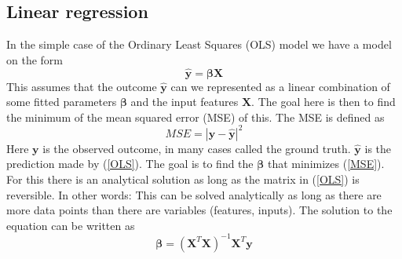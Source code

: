 \subsection{Linear regression}
In the simple case of the Ordinary Least Squares (OLS) model we have a model on the form 
\begin{equation}
\mathbf{\hat{y}} = \mathbf{\beta} \mathbf{X}
\label{OLS}
\end{equation}
This assumes that the outcome $\mathbf{\hat{y}}$ can we represented as a linear combination 
of some fitted parameters $\mathbf{\beta}$ and the input features $\mathbf{X}$.
The goal here is then to find the minimum of the mean squared error (MSE) of this.
The MSE is defined as 
\begin{equation}
MSE = |\mathbf{y} - \mathbf{\hat{y}}|^2
\label{MSE}
\end{equation}
Here $\mathbf{y}$ is the observed outcome, in many cases called the ground truth.
$\mathbf{\hat{y}}$ is the prediction made by (\ref{OLS}). The goal is to find the
$\mathbf{\beta}$ that minimizes (\ref{MSE}). For this there is an analytical solution 
as long as the matrix in (\ref{OLS}) is reversible. In other words: This can be solved
analytically as long as there are more data points than there are variables (features, inputs).
The solution to the equation can be written as 
\begin{equation}
\mathbf{\beta} = (\mathbf{X}^T\mathbf{X})^{-1}\mathbf{X}^{T}\mathbf{y}
\label{OLS solution}
\end{equation}
